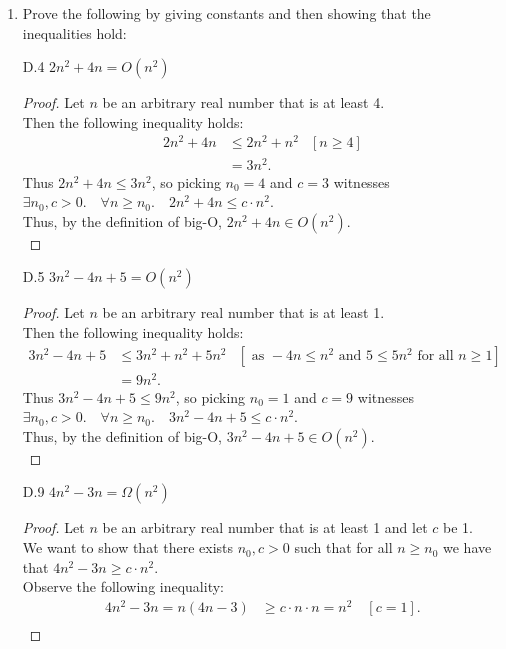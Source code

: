 \documentclass[10pt]{article}
\begin{document}
\begin{enumerate}[label={}]
    \item Prove the following by giving constants and then showing that the inequalities hold:


          D.4 $2 n^2+4 n=O\left(n^2\right)$
          \begin{proof}
              Let $n$ be an arbitrary real number that is at least 4.\\
              Then the following inequality holds:
              $$
                  \begin{aligned}
                      2n^2+4n & \leq 2 n^2+ n^2
                              & {\left[n \geq 4\right] } \\
                              & = 3 n^2 .
                  \end{aligned}
              $$
              Thus $2 n^2+4n \leq 3 n^2$, so picking $n_0=4$ and $c=3$ witnesses \\$\exists n_0, c>0 .\quad \forall n \geq n_0 .\quad 2 n^2+4n \leq c \cdot n^2$.\\
                  Thus, by the definition of big-O, $2 n^2+4n \in O\left(n^2\right)$.\\
          \end{proof}
          D.5 $3 n^2-4 n+5=O\left(n^2\right)$
          \begin{proof}
              Let $n$ be an arbitrary real number that is at least 1.\\
              Then the following inequality holds:
              $$
                  \begin{aligned}
                      3n^2-4n+5 & \leq 3n^2+n^2+5n^2
                                & {\left[\text { as } -4n \leq n^2 \text { and } 5 \leq 5n^2 \text { for all } n \geq 1\right] } \\
                                & = 9 n^2 .
                  \end{aligned}
              $$
              Thus $3 n^2-4 n+5 \leq 9 n^2$, so picking $n_0=1$ and $c=9$ witnesses \\$\exists n_0, c>0 .\quad \forall n \geq n_0 .\quad 3 n^2-4 n+5 \leq c \cdot n^2$.\\
                  Thus, by the definition of big-O, $3 n^2-4 n+5 \in O\left(n^2\right)$.\\
          \end{proof}
          \newpage

          D.9 $4 n^2-3 n=\Omega\left(n^2\right)$
          \begin{proof}
              Let $n$ be an arbitrary real number that is at least 1 and let $c$ be 1.\\
              We want to show that there exists $n_0, c > 0$ such that for all $n\geq n_0$ we have that $4 n^2-3 n\geq c \cdot n^2$.\\
              Observe the following inequality:\\
              $$
                  \begin{aligned}
                      4 n^2-3 n=n(4 n-3) & \geq c \cdot n \cdot n = n^2 \quad[c=1]. \\
                  \end{aligned}
              $$


\end{proof}
\end{enumerate}
\end{document}

